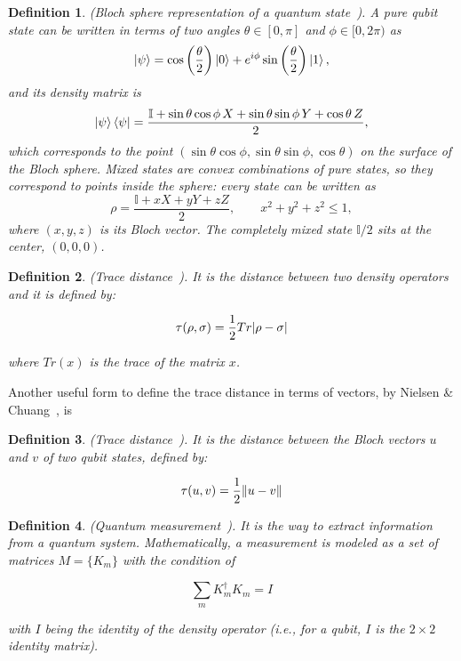 \documentclass{ieeeaccess}
\newtheorem{definition}{Definition}[section]
\begin{document}
\begin{definition}
  (Bloch sphere representation of a quantum state~\cite{watrous_bloch_sphere}). A pure qubit state can be written in terms of two angles $\theta \in [0, \pi]$ and $\phi \in [0, 2\pi)$ as
  \[
    \ket{\psi} = \cos\left(\frac{\theta}{2}\right)\ket{0} + e^{i\phi}\sin\left(\frac{\theta}{2}\right)\ket{1},
  \]
  and its density matrix is
  \[
    \ket{\psi}\bra{\psi} = \frac{\mathbb{I} + \sin\theta\cos\phi\, X + \sin\theta\sin\phi\, Y + \cos\theta\, Z}{2},
  \]
  which corresponds to the point $(\sin\theta\cos\phi, \sin\theta\sin\phi, \cos\theta)$ on the surface of the Bloch sphere. Mixed states are convex combinations of pure states, so they correspond to points inside the sphere: every state can be written as
  \[
    \rho = \frac{\mathbb{I} + xX + yY + zZ}{2}, \qquad x^2 + y^2 + z^2 \leq 1,
  \]
  where $(x, y, z)$ is its Bloch vector. The completely mixed state $\mathbb{I}/2$ sits at the center, $(0, 0, 0)$.
  \label{def:bloch_representation}
\end{definition}



\begin{definition}
  (Trace distance~\cite{zhou2017differential}). It is the distance between two density operators and it is defined by:

  \[
    \tau(\rho, \sigma) = \frac{1}{2}Tr\abs{\rho - \sigma}
  \]

  where $Tr(x)$ is the trace of the matrix $x$.
  \label{def:trace_distance}
\end{definition}

Another useful form to define the trace distance in terms of vectors, by Nielsen \& Chuang~\cite{Nielsen_Chuang_2010}, is

\begin{definition}
  (Trace distance~\cite[Sec.~9.2.1, Eq.~(9.20)]{Nielsen_Chuang_2010}). It is the distance between the Bloch vectors $u$ and $v$ of two qubit states, defined by:

  \[
    \tau(u, v) = \frac{1}{2}\norm{u - v}
  \]
  \label{def:trace_distance_vector}
\end{definition}

\begin{definition}
  (Quantum measurement~\cite{zhou2017differential}). It is the way to extract information from a quantum system. Mathematically, a measurement is modeled as a set of matrices $M = \{K_m\}$ with the condition of

  \[
    \sum_m K^{\dagger}_{m}K_{m} = I
  \]

  with $I$ being the identity of the density operator (i.e., for a qubit, $I$ is the $2\times2$ identity matrix).
  \label{def:quantum_measurement}
\end{definition}
\end{document}
